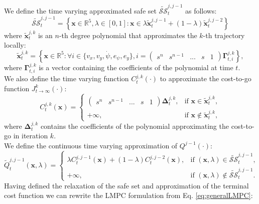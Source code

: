 We define the time varying approximated safe set $\tilde{\mathcal{SS}}_t^{j,j-1}$ as follows:
\begin{equation}
\tilde{\mathcal{SS}}_t^{j,j-1} = \left\{\bm{x}\in\mathbb{R}^5,\lambda\in[0,1]: \bm{x}\in\lambda \tilde{\bm{x}}_t^{j,j-1}+(1-\lambda)\tilde{\bm{x}}_t^{j,j-2}\right\}
\end{equation}
where $\tilde{\bm{x}}_t^{j,k}$ is an $n$-th degree polynomial that approximates the $k$-th trajectory locally:
\begin{equation}
\tilde{\bm{x}}_t^{j,k}=\left\{\bm{x}\in\mathbb{R}^5:\forall i\in\{v_x,v_y,\dot\psi,e_\psi,e_y\},i=\begin{pmatrix}s^n &s^{n-1}&...&s& 1\end{pmatrix}\bm{\Gamma}_{t,i}^{j,k}\right\},
\end{equation}
where $\bm{\Gamma}_{t,i}^{j,k}$ is a vector containing the coefficients of the polynomial at time $t$.\\
We also define the time varying function $C_t^{j,k}(\cdot)$ to approximate the cost-to-go function $J_{t\rightarrow\infty}^k(\cdot)$:
\begin{equation}
C_t^{j,k}(\bm{x})=\begin{cases}
\begin{pmatrix}
s^n & s^{n-1} &...&s&1
\end{pmatrix}
\bm{\Delta}_t^{j,k},&\text{if } \bm{x}\in\tilde{\bm{x}}_t^{j,k},\\
+\infty,&\text{if } \bm{x}\not\in\tilde{\bm{x}}_t^{j,k},
\end{cases}
\end{equation}
where $\bm{\Delta}_t^{j,k}$ contains the coefficients of the polynomial approximating the cost-to-go in iteration $k$.\\
We define the continuous time varying approximation of $Q^{j-1}(\cdot)$:
\begin{equation}
\tilde Q_t^{j,j-1}(\bm{x},\lambda)=\begin{cases}
\lambda C_t^{j,j-1}(\bm{x})+(1-\lambda)C_t^{j,j-2}(\bm{x}),&\text{if }(\bm{x},\lambda)\in\tilde{\mathcal{SS}}_t^{j,j-1},\\
+\infty,&\text{if }(\bm{x},\lambda)\not\in\tilde{\mathcal{SS}}_t^{j,j-1}.
\end{cases}
\end{equation}
Having defined the relaxation of the safe set and approximation of the terminal cost function we can rewrite the LMPC formulation from Eq. \eqref{eq:generalLMPC}:
